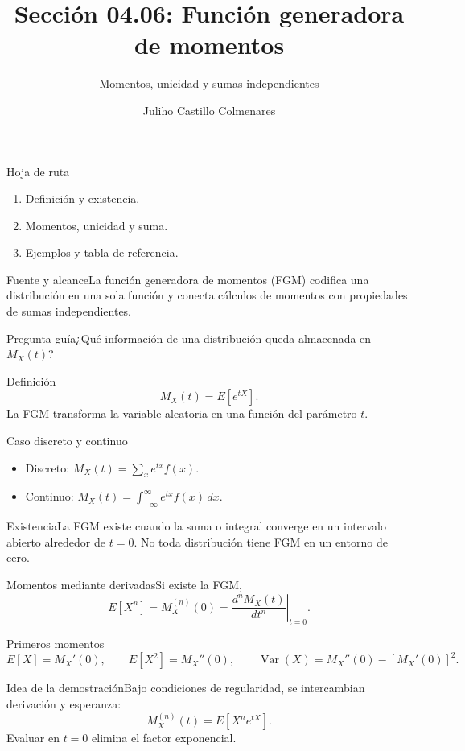 \documentclass[10pt,aspectratio=169]{beamer}
\title[Función generadora de momentos]{Sección 04.06: Función generadora de momentos}\subtitle{Momentos, unicidad y sumas independientes}\author[J. Castillo Colmenares]{Juliho Castillo Colmenares}\institute{Tecnológico de Monterrey}\date{}
\begin{document}
\begin{frame}[plain]\titlepage\end{frame}
\begin{frame}{Hoja de ruta}\small\begin{enumerate}\item Definición y existencia.\item Momentos, unicidad y suma.\item Ejemplos y tabla de referencia.\end{enumerate}\end{frame}
\begin{frame}{Fuente y alcance}\small La función generadora de momentos (FGM) codifica una distribución en una sola función y conecta cálculos de momentos con propiedades de sumas independientes.\begin{block}{Pregunta guía}¿Qué información de una distribución queda almacenada en $M_X(t)$?\end{block}\end{frame}
\begin{frame}{Definición}\small\[M_X(t)=E[e^{tX}].\]La FGM transforma la variable aleatoria en una función del parámetro $t$.\end{frame}
\begin{frame}{Caso discreto y continuo}\small\begin{itemize}\item Discreto: $M_X(t)=\sum_x e^{tx}f(x)$.\item Continuo: $M_X(t)=\int_{-\infty}^{\infty}e^{tx}f(x)\,dx$.\end{itemize}\end{frame}
\begin{frame}{Existencia}\small La FGM existe cuando la suma o integral converge en un intervalo abierto alrededor de $t=0$. No toda distribución tiene FGM en un entorno de cero.\end{frame}
\begin{frame}{Momentos mediante derivadas}\small Si existe la FGM,\[E[X^n]=M_X^{(n)}(0)=\left.\frac{d^nM_X(t)}{dt^n}\right|_{t=0}.\]\end{frame}
\begin{frame}{Primeros momentos}\small\[E[X]=M_X'(0),\qquad E[X^2]=M_X''(0),\qquad \operatorname{Var}(X)=M_X''(0)-[M_X'(0)]^2.\]\end{frame}
\begin{frame}{Idea de la demostración}\small Bajo condiciones de regularidad, se intercambian derivación y esperanza:\[M_X^{(n)}(t)=E[X^ne^{tX}].\]Evaluar en $t=0$ elimina el factor exponencial.\end{frame}
\end{document}

